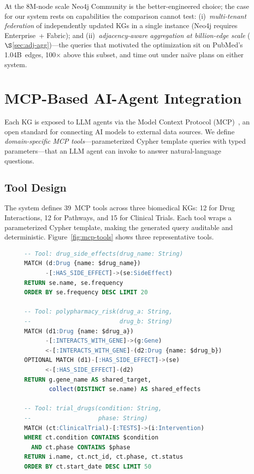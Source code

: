 \documentclass[runningheads]{llncs}
\begin{document}
At the 8M-node scale Neo4j Community is the better-engineered
choice; the case for our system rests on capabilities the
comparison cannot test: (i)~\emph{multi-tenant federation} of
independently updated KGs in a single instance (Neo4j requires
Enterprise~+ Fabric); and (ii)~\emph{adjacency-aware aggregation
at billion-edge scale} ($\S$\ref{sec:adj-agg})---the queries that
motivated the optimization sit on PubMed's 1.04B~edges,
100$\times$ above this subset, and time out under na\"ive plans
on either system.

\section{MCP-Based AI-Agent Integration}\label{sec:mcp}

Each KG is exposed to LLM agents via the Model Context
Protocol (MCP)~\cite{anthropic2024mcp}, an open standard for
connecting AI models to external data sources.  We define
\emph{domain-specific MCP tools}---parameterized Cypher template
queries with typed parameters---that an LLM agent can invoke
to answer natural-language questions.

\subsection{Tool Design}

The system defines 39~MCP tools across three biomedical KGs:
12 for Drug Interactions, 12 for Pathways, and
15 for Clinical Trials.
Each tool wraps a parameterized Cypher template, making the
generated query auditable and deterministic.
Figure~\ref{fig:mcp-tools} shows three representative tools.

\begin{figure}[t]
\begin{lstlisting}[language=SQL,caption={Three MCP tool definitions
  (simplified).  Each tool declares typed parameters and a
  Cypher template; the agent never generates free-form Cypher.},
  label=fig:mcp-tools]
-- Tool: drug_side_effects(drug_name: String)
MATCH (d:Drug {name: $drug_name})
      -[:HAS_SIDE_EFFECT]->(se:SideEffect)
RETURN se.name, se.frequency
ORDER BY se.frequency DESC LIMIT 20

-- Tool: polypharmacy_risk(drug_a: String,
--                         drug_b: String)
MATCH (d1:Drug {name: $drug_a})
      -[:INTERACTS_WITH_GENE]->(g:Gene)
      <-[:INTERACTS_WITH_GENE]-(d2:Drug {name: $drug_b})
OPTIONAL MATCH (d1)-[:HAS_SIDE_EFFECT]->(se)
      <-[:HAS_SIDE_EFFECT]-(d2)
RETURN g.gene_name AS shared_target,
       collect(DISTINCT se.name) AS shared_effects

-- Tool: trial_drugs(condition: String,
--                   phase: String)
MATCH (ct:ClinicalTrial)-[:TESTS]->(i:Intervention)
WHERE ct.condition CONTAINS $condition
  AND ct.phase CONTAINS $phase
RETURN i.name, ct.nct_id, ct.phase, ct.status
ORDER BY ct.start_date DESC LIMIT 50
\end{lstlisting}
\end{figure}
\end{document}
